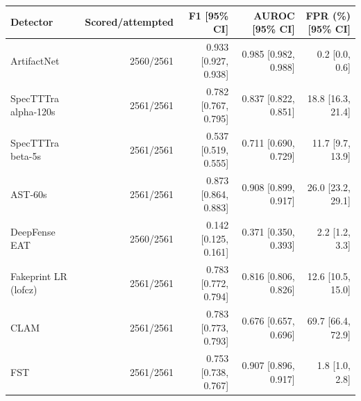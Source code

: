 \begin{tabular}{lrrrr}
\toprule
Detector & Scored/attempted & F1 [95\% CI] & AUROC [95\% CI] & FPR (\%) [95\% CI] \\
\midrule
ArtifactNet & 2560/2561 & 0.933 [0.927, 0.938] & 0.985 [0.982, 0.988] & 0.2 [0.0, 0.6] \\
SpecTTTra alpha-120s & 2561/2561 & 0.782 [0.767, 0.795] & 0.837 [0.822, 0.851] & 18.8 [16.3, 21.4] \\
SpecTTTra beta-5s & 2561/2561 & 0.537 [0.519, 0.555] & 0.711 [0.690, 0.729] & 11.7 [9.7, 13.9] \\
AST-60s & 2561/2561 & 0.873 [0.864, 0.883] & 0.908 [0.899, 0.917] & 26.0 [23.2, 29.1] \\
DeepFense EAT & 2560/2561 & 0.142 [0.125, 0.161] & 0.371 [0.350, 0.393] & 2.2 [1.2, 3.3] \\
Fakeprint LR (lofcz) & 2561/2561 & 0.783 [0.772, 0.794] & 0.816 [0.806, 0.826] & 12.6 [10.5, 15.0] \\
CLAM & 2561/2561 & 0.783 [0.773, 0.793] & 0.676 [0.657, 0.696] & 69.7 [66.4, 72.9] \\
FST & 2561/2561 & 0.753 [0.738, 0.767] & 0.907 [0.896, 0.917] & 1.8 [1.0, 2.8] \\
\bottomrule
\end{tabular}
